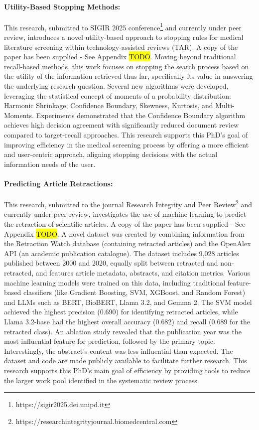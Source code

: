 \documentclass[10pt,oneside]{book}
\begin{document}
\paragraph{Utility-Based Stopping Methods: } This research, submitted to SIGIR 2025 conference\footnote{https://sigir2025.dei.unipd.it} and currently under peer review, introduces a novel utility-based approach to stopping rules for medical literature screening within technology-assisted reviews (TAR). A copy of the paper has been supplied - See Appendix \hl{TODO}. Moving beyond traditional recall-based methods, this work focuses on stopping the search process based on the utility of the information retrieved thus far, specifically its value in answering the underlying research question. Several new algorithms were developed, leveraging the statistical concept of moments of a probability distribution: Harmonic Shrinkage, Confidence Boundary, Skewness, Kurtosis, and Multi-Moments. Experiments demonstrated that the Confidence Boundary algorithm achieves high decision agreement with significantly reduced document review compared to target-recall approaches. This research supports this PhD's goal of improving efficiency in the medical screening process by offering a more efficient and user-centric approach, aligning stopping decisions with the actual information needs of the user.

\paragraph{Predicting Article Retractions: } This research, submitted to the journal Research Integrity and Peer Review\footnote{https://researchintegrityjournal.biomedcentral.com} and currently under peer review, investigates the use of machine learning to predict the retraction of scientific articles. A copy of the paper has been supplied - See Appendix \hl{TODO}. A novel dataset was created by combining information from the Retraction Watch database (containing retracted articles) and the OpenAlex API (an academic publication catalogue). The dataset includes 9,028 articles published between 2000 and 2020, equally split between retracted and non-retracted, and features article metadata, abstracts, and citation metrics. Various machine learning models were trained on this data, including traditional feature-based classifiers (like Gradient Boosting, SVM, XGBoost, and Random Forest) and LLMs such as BERT, BioBERT, Llama 3.2, and Gemma 2. The SVM model achieved the highest precision (0.690) for identifying retracted articles, while Llama 3.2-base had the highest overall accuracy (0.682) and recall (0.689 for the retracted class). An ablation study revealed that the publication year was the most influential feature for prediction, followed by the primary topic. Interestingly, the abstract's content was less influential than expected. The dataset and code are made publicly available to facilitate further research. This research supports this PhD's main goal of efficiency by providing tools to reduce the larger work pool identified in the systematic review process.
\end{document}
